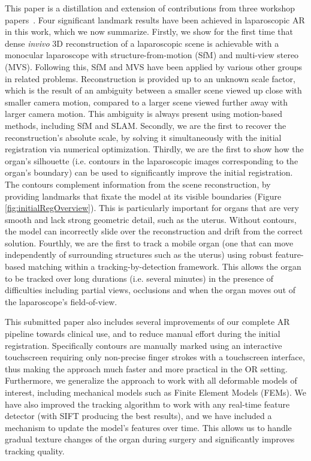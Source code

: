 This paper is a distillation and extension of contributions from three workshop papers~\cite{Collins2044,Collins2013,Collins2017System}. Four significant landmark results have been achieved in laparoscopic AR in this work, which we now summarize. Firstly, we show for the first time that dense \textit{invivo} 3D reconstruction of a laparoscopic scene is achievable with a monocular laparoscope with structure-from-motion (SfM) and multi-view stereo (MVS). Following this, SfM and MVS have been applied by various other groups in related problems. Reconstruction is provided up to an unknown scale factor, which is the result of an ambiguity between a smaller scene viewed up close with smaller camera motion, compared to a larger scene viewed further away with larger camera motion. This ambiguity is always present using motion-based methods, including SfM and SLAM. %
Secondly, we are the first to recover the reconstruction's absolute scale, by solving it simultaneously with the initial registration via numerical optimization. %
Thirdly, we are the first to show how the organ's silhouette (i.e. contours in the laparoscopic images corresponding to the organ's boundary) can be used to significantly improve the initial registration. The contours complement information from the scene reconstruction, by providing landmarks that fixate the model at its visible boundaries (Figure \ref{fig:initialRegOverview}). This is particularly important for organs that are very smooth and lack strong geometric detail, such as the uterus. Without contours, the model can incorrectly slide over the reconstruction and drift from the correct solution. Fourthly, we are the first to track a mobile organ (one that can move independently of surrounding structures such as the uterus) using robust feature-based matching within a tracking-by-detection framework. This allows the organ to be tracked over long durations (i.e. several minutes) in the presence of difficulties including partial views, occlusions and when the organ moves out of the laparoscope's field-of-view. 

This submitted paper also includes several improvements of our complete AR pipeline towards clinical use, and to reduce manual effort during the initial registration. Specifically contours are manually marked using an interactive touchscreen requiring only non-precise finger strokes with a touchscreen interface, thus making the approach much faster and more practical in the OR setting. Furthermore, we generalize the approach to work with all deformable models of interest, including mechanical models such as Finite Element Models (FEMs). We have also improved the tracking algorithm to work with any real-time feature detector (with SIFT producing the best results), and we have included a mechanism to update the model's features over time. This allows us to handle gradual texture changes of the organ during surgery and significantly improves tracking quality. 

